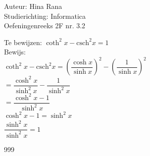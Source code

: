 \documentclass[a4paper]{article}
\begin{document}
\noindent \large Auteur: Hina Rana \\
\noindent \large Studierichting: Informatica\\
\noindent \large Oefeningenreeks 2F nr. 3.2\\

\medskip

\normalsize
Te bewijzen: $\coth^2 x - \text{csch}^2 x = 1$\\

Bewijs:\\

$\coth^2 x - \text{csch}^2 x = \left(\dfrac{\cosh x}{\sinh x}\right)^2 - \left(\dfrac{1}{\sinh x}\right)^2$\\

$= \dfrac{\cosh^2 x}{\sinh^2 x} - \dfrac{1}{\sinh^2 x}$\\

$= \dfrac{\cosh^2 x - 1}{\sinh^2 x}$\\

$\cosh^2 x - 1 = \sinh^2 x$\\

$\dfrac{\sinh^2 x}{\sinh^2 x} = 1$

\begin{thebibliography}{999}
\end{thebibliography}
\end{document}
